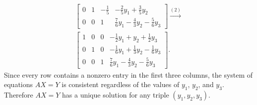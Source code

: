 \begin{solution}
\begin{gather*}
\begin{bmatrix}
      0 & 1 & -\frac15 & -\frac25y_1 + \frac35y_2 \\[3pt]
      0 & 0 & 1 & \frac76y_1 - \frac43y_2 - \frac56y_3
    \end{bmatrix}
    \xrightarrow{(2)} \\
    \begin{bmatrix}
      1 & 0 & 0 & -\frac12y_1 + y_2 + \frac12y_3 \\[3pt]
      0 & 1 & 0 & -\frac16y_1 + \frac13y_2 - \frac16y_3 \\[3pt]
      0 & 0 & 1 & \frac76y_1 - \frac43y_2 - \frac56y_3
    \end{bmatrix}.
  \end{gather*}
  Since every row contains a nonzero entry in the first three columns,
  the system of equations $AX = Y$ is consistent regardless of the
  values of $y_1$, $y_2$, and $y_3$. Therefore $AX = Y$ has a unique
  solution for any triple $(y_1,y_2,y_3)$.
\end{solution}
